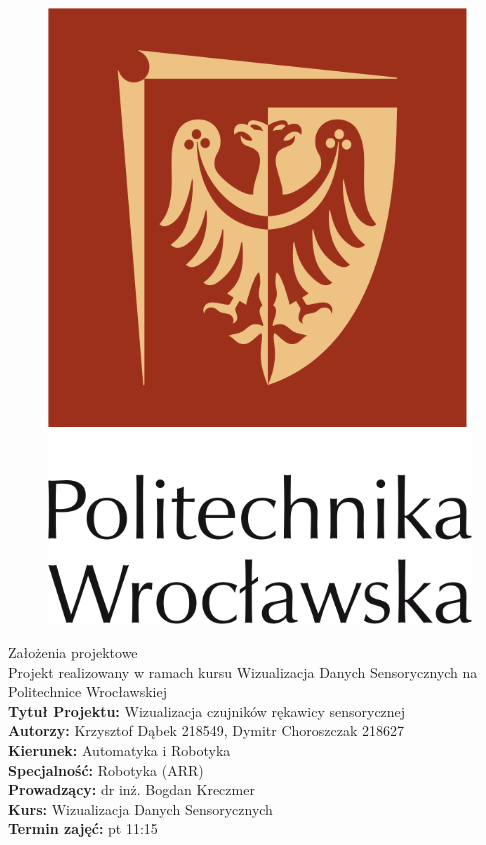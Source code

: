 \documentclass[10pt,a4paper]{article}
\begin{document}
\begin{figure}[!htb]
\centering
\includegraphics[scale=1.6]{logo.png}
\end{figure}
\LARGE\centering Założenia projektowe\\
\large\centering Projekt realizowany w ramach kursu Wizualizacja Danych Sensorycznych na Politechnice Wrocławskiej\\
\vspace{5 mm}
\normalsize\flushleft\textbf{Tytuł Projektu:} Wizualizacja czujników rękawicy sensorycznej\\
\textbf{Autorzy:} Krzysztof Dąbek 218549, Dymitr Choroszczak 218627\\
\textbf{Kierunek:} Automatyka i Robotyka\\
\textbf{Specjalność:} Robotyka (ARR)\\
\textbf{Prowadzący:} dr inż. Bogdan Kreczmer\\
\textbf{Kurs:} Wizualizacja Danych Sensorycznych\\
\textbf{Termin zajęć:} pt 11:15\\
\vspace{5 mm}
\end{document}
